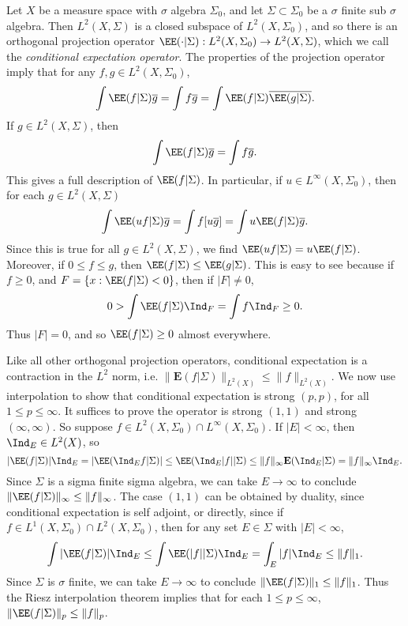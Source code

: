 \begin{example}
Let $X$ be a measure space with $\sigma$ algebra $\Sigma_0$, and let $\Sigma \subset \Sigma_0$ be a $\sigma$ finite sub $\sigma$ algebra. Then $L^2(X,\Sigma)$ is a closed subspace of $L^2(X,\Sigma_0)$, and so there is an orthogonal projection operator $\EE(\cdot|\Sigma): L^2(X,\Sigma_0) \to L^2(X,\Sigma)$, which we call the \emph{conditional expectation operator}. The properties of the projection operator imply that for any $f,g \in L^2(X, \Sigma_0)$,
%
\[ \int \EE(f|\Sigma) \overline{g} = \int f \overline{g} = \int \EE(f|\Sigma) \overline{\EE(g|\Sigma)}. \]
%
If $g \in L^2(X,\Sigma)$, then
%
\[ \int \EE(f|\Sigma) \overline{g} = \int f \overline{g}. \]
%
This gives a full description of $\EE(f|\Sigma)$. In particular, if $u \in L^\infty(X,\Sigma_0)$, then for each $g \in L^2(X,\Sigma)$
%
\[ \int \EE(uf|\Sigma) \overline{g} = \int f [u\overline{g}] = \int u \EE(f|\Sigma) \overline{g}. \]
%
Since this is true for all $g \in L^2(X,\Sigma)$, we find $\EE(uf|\Sigma) = u \EE(f|\Sigma)$. Moreover, if $0 \leq f \leq g$, then $\EE(f|\Sigma) \leq \EE(g|\Sigma)$. This is easy to see because if $f \geq 0$, and $F = \{ x : \EE(f|\Sigma) < 0 \}$, then if $|F| \neq 0$,
%
\[ 0 > \int \EE(f|\Sigma) \Ind_F = \int f \Ind_F \geq 0. \]
%
Thus $|F| = 0$, and so $\EE(f|\Sigma) \geq 0$ almost everywhere.

Like all other orthogonal projection operators, conditional expectation is a contraction in the $L^2$ norm, i.e. $\| \mathbf{E}(f|\Sigma) \|_{L^2(X)} \leq \| f \|_{L^2(X)}$. We now use interpolation to show that conditional expectation is strong $(p,p)$, for all $1 \leq p \leq \infty$. It suffices to prove the operator is strong $(1,1)$ and strong $(\infty,\infty)$. So suppose $f \in L^2(X,\Sigma_0) \cap L^\infty(X,\Sigma_0)$. If $|E| < \infty$, then $\Ind_E \in L^2(X)$, so
%
\[ |\EE(f|\Sigma)| \Ind_E = |\EE(\Ind_E f | \Sigma)| \leq \EE(\Ind_E |f| | \Sigma) \leq \| f \|_\infty \mathbf{E}(\Ind_E|\Sigma) = \| f \|_\infty \Ind_E. \]
%
Since $\Sigma$ is a sigma finite sigma algebra, we can take $E \to \infty$ to conclude $\| \EE(f|\Sigma) \|_\infty \leq \| f \|_\infty$. The case $(1,1)$ can be obtained by duality, since conditional expectation is self adjoint, or directly, since if $f \in L^1(X,\Sigma_0) \cap L^2(X,\Sigma_0)$, then for any set $E \in \Sigma$ with $|E| < \infty$,
%
\[ \int |\EE(f|\Sigma)| \Ind_E \leq \int \EE(|f||\Sigma) \Ind_E = \int_E |f| \Ind_E \leq \| f \|_1. \]
%
Since $\Sigma$ is $\sigma$ finite, we can take $E \to \infty$ to conclude $\| \EE(f|\Sigma) \|_1 \leq \| f \|_1$. Thus the Riesz interpolation theorem implies that for each $1 \leq p \leq \infty$, $\| \EE(f|\Sigma) \|_p \leq \| f \|_p$.


\end{example}
